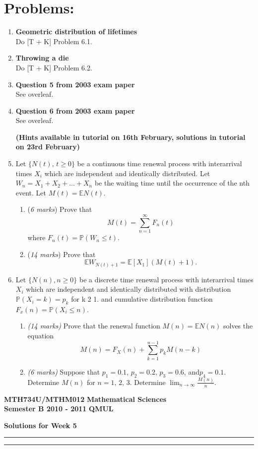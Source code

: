 \documentclass[11pt,a4paper]{article}
\begin{document}
  \section*{Problems:}
  \begin{enumerate}
    \item \textbf{Geometric distribution of lifetimes}\\
    Do [T + K] Problem 6.1.
    \item \textbf{Throwing a die}\\
    Do [T + K] Problem 6.2.
    \item \textbf{Question 5 from 2003 exam paper}\\
    See overleaf.
    \item \textbf{Question 6 from 2003 exam paper}\\
    See overleaf.\par 
    \textbf{(Hints available in tutorial on 16th February, solutions in tutorial on 23rd February)}
    \item Let $\{N(t),\, t \geq 0\}$ be a continuous time renewal process with interarrival times $X_i$ which are independent and identically distributed. Let $W_n = X_1 + X_2 +\ldots + X_n$ be the waiting time until the occurrence of the nth event. Let $M(t) = \mathbb{E}N(t)$.
    \begin{enumerate}
      \item (\textit{6 marks}) Prove that
      $$
      M(t) = \sum_{n = 1}^\infty F_n(t)
      $$
      where $F_n(t) = \mathbb{P}(W_n \leq t)$.
      \item (\textit{14 marks}) Prove that
      $$
      \mathbb{E}W_{N(t) + 1} = \mathbb{E}[X_1](M(t) + 1).
      $$ 
    \end{enumerate}
    \item Let $\{N(n), n\geq 0\}$ be a discrete time renewal process with interarrival times $X_i$ which are independent and identically distributed with distribution $\mathbb{P}(X_i = k) = p_k$ for k 2 1. and cumulative distribution function $F_x(n) = \mathbb{P}(X_i \leq n)$.
    \begin{enumerate}
      \item \textit{(14 marks)} Prove that the renewal function $M(n) = \mathbb{E}N(n)$ solves the equation
      $$
      M(n) = F_X(n) + \sum_{k = 1}^{n - 1}p_kM(n - k)
      $$
      \item \textit{(6 marks)} Suppose that $p_1 = 0.1,\, p_2 = 0.2,\, p_3 = 0.6$, and$p_4 = 0.1$. Determine $M(n)$ for $n = 1,\, 2,\, 3$. Determine $\lim_{n\to\infty} \frac{M(n)}{n}$.
    \end{enumerate}
  \end{enumerate}
  \newpage
  \textbf{MTH734U/MTHM012} \hfill \textbf{Mathematical Sciences}\\
  \textbf{Semester B 2010 - 2011} \hfill \textbf{QMUL}
  \begin{center}
    \textbf{\huge Solutions for Week 5}
  \end{center}
  \hrule \vspace{2mm} \hrule
\end{document}
